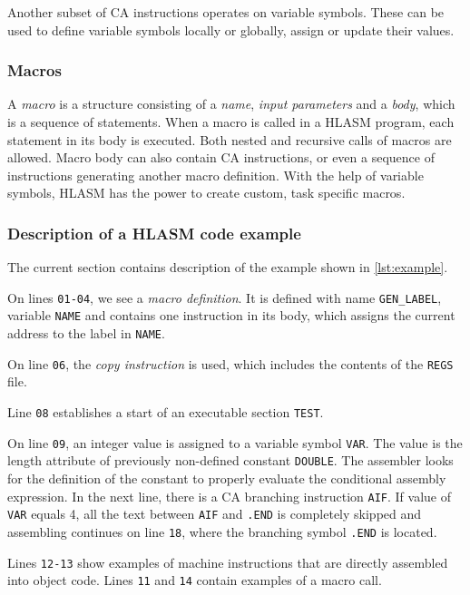 Another subset of CA instructions operates on variable symbols. These can be used to define variable symbols locally or globally, assign or update their values.

\subsubsection{Macros}

A \emph{macro} is a structure consisting of a \emph{name}, \emph{input parameters} and a \emph{body}, which is a sequence of statements. When a macro is called in a HLASM program, each statement in its body is executed. Both nested and recursive calls of macros are allowed. Macro body can also contain CA instructions, or even a sequence of instructions generating another macro definition. With the help of variable symbols, HLASM has the power to create custom, task specific macros.

\subsubsection{Description of a HLASM code example}
\label{hlasm_ex}

The current section contains description of the example shown in  \cref{lst:example}.

On lines \verb|01-04|, we see a \emph{macro definition}. It is defined with name \verb|GEN_LABEL|, variable \verb|NAME| and contains one instruction in its body, which assigns the current address to the label in \verb|NAME|.

On line \verb|06|, the \emph{copy instruction} is used, which includes the contents of the \verb|REGS| file.

Line \verb|08| establishes a start of an executable section \verb|TEST|. 

On line \verb|09|, an integer value is assigned to a variable symbol \verb|VAR|. The value is the length attribute of previously non-defined constant \verb|DOUBLE|. The assembler looks for the definition of the constant to properly evaluate the conditional assembly expression. In the next line, there is a CA branching instruction \verb|AIF|. If value of \verb|VAR| equals 4, all the text between \verb|AIF| and \verb|.END| is completely skipped and assembling continues on line \verb|18|, where the branching symbol \verb|.END| is located.

Lines \verb|12-13| show examples of machine instructions that are directly assembled into object code. Lines \verb|11| and \verb|14| contain examples of a macro call.

